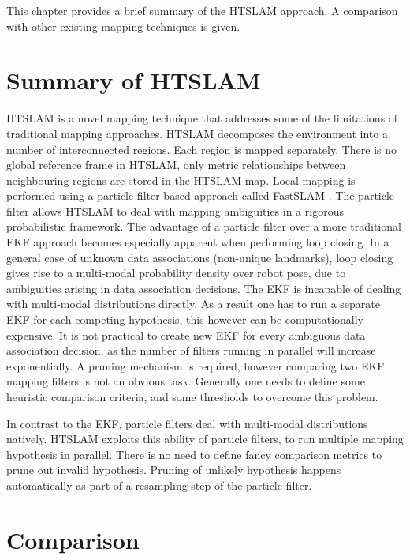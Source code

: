 This chapter provides a brief summary of the HTSLAM approach. A comparison
with other existing mapping techniques is given. 


\section{Summary of HTSLAM}


HTSLAM is a novel mapping technique that addresses some of the
limitations of traditional mapping approaches. HTSLAM decomposes the
environment into a number of interconnected regions. Each region is
mapped separately. There is no global reference frame in HTSLAM, only
metric relationships between neighbouring regions are stored in the
HTSLAM map. Local mapping is performed using a particle filter based
approach called FastSLAM \cite{fastslam, fastslam2}. The particle filter
allows HTSLAM to deal with mapping ambiguities in a rigorous
probabilistic framework. The advantage of a particle filter over a more
traditional EKF approach becomes especially apparent when performing
loop closing. In a general case of unknown data associations
(non-unique landmarks), loop closing gives rise to a multi-modal
probability density over robot pose, due to ambiguities arising in
data association decisions. The EKF is incapable of dealing with
multi-modal distributions directly. As a result one has to run
a separate EKF for each competing hypothesis, this however can be
computationally expensive. It is not practical to create new EKF for
every ambiguous data association decision, as the number of filters
running in parallel will increase exponentially. A pruning mechanism
is required, however comparing two EKF mapping filters is not an
obvious task. Generally one needs to define some heuristic
comparison criteria, and some thresholds to overcome this problem.

In contrast to the EKF, particle filters deal with multi-modal
distributions natively. HTSLAM exploits this ability of particle
filters, to run multiple mapping hypothesis in parallel. There is no
need to define fancy comparison metrics to prune out invalid
hypothesis. Pruning of unlikely hypothesis happens automatically as
part of a resampling step of the particle filter. 


\section{Comparison}

